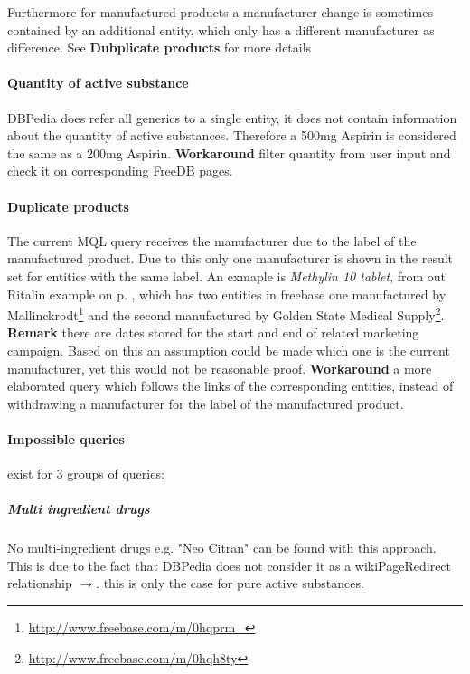 \documentclass[11pt,titlepage,oneside,openany]{book}
\begin{document}
Furthermore for manufactured products a manufacturer change is sometimes contained by an additional entity, which only has a different manufacturer as difference. See \textbf{Dubplicate products} for more details

\paragraph{Quantity of active substance}
DBPedia does refer all generics to a single entity, it does not contain information about the quantity of active substances. Therefore a 500mg Aspirin is considered the same as a 200mg Aspirin.
\textbf{Workaround} filter quantity from user input and check it on corresponding FreeDB pages.


\paragraph{Duplicate products}
\label{limitations:dubplicates} 
The current MQL query receives the manufacturer due to the label of the manufactured product. Due to this only one manufacturer is shown in the result set for entities with the same label. An exmaple is \textit{Methylin 10 tablet}, from out Ritalin example on  p. \pageref{example:ritalin}, which has two entities in freebase one manufactured by Mallinckrodt\footnote{\url{http://www.freebase.com/m/0hqprm_}} and the second manufactured by Golden State Medical Supply\footnote{\url{http://www.freebase.com/m/0hqh8ty}}. \textbf{Remark} there are dates stored for the start and end of related marketing campaign. Based on this an assumption could be made which one is the current manufacturer, yet this would not be reasonable proof. \textbf{Workaround} a more elaborated query which follows the links of the corresponding entities, instead of withdrawing a manufacturer for the label of the manufactured product.


\paragraph{Impossible queries} exist for 3 groups of queries:


\label{drug_cocktail}
\subparagraph{Multi ingredient drugs} No multi-ingredient drugs e.g. "Neo Citran" can be found with this approach. This is due to the fact that DBPedia does not consider it as a wikiPageRedirect relationship $\rightarrow$. this is only the case for pure active substances.
\end{document}
